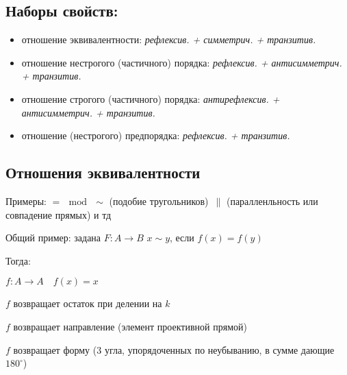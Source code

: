 \subsection*{Наборы свойств:}
\begin{itemize}
    \item отношение эквивалентности: \textit{рефлексив. + симметрич. + транзитив.}
    \item отношение нестрогого (частичного) порядка: \textit{рефлексив. + антисимметрич. + транзитив.}
    \item отношение строгого (частичного) порядка: \textit{антирефлексив. + антисимметрич. + транзитив.}
    \item отношение (нестрогого) предпорядка: \textit{рефлексив. + транзитив.}
\end{itemize}

\subsection*{Отношения эквивалентности}
Примеры: $= \, \bmod \, \sim $ (подобие тругольников) $\, \| $ (паралленльность или совпадение прямых) и тд


Общий пример: задана $F: A \to B$ \quad $x \sim y$, если $f(x) = f(y)$


Тогда: 
\begin{flushleft}
    \hspace{10mm}\fbox{=} $f: A \to A \quad f(x) = x$
    
    \hspace{10mm} $f$ возвращает остаток при делении на $k$
    
    \hspace{10mm}\fbox{$\|$} $f$ возвращает направление (элемент проективной прямой)
    
    \hspace{10mm}\fbox{$\sim$} $f$ возвращает форму (3 угла, упорядоченных по неубыванию, в сумме дающие $180^{\circ}$)
\end{flushleft}

